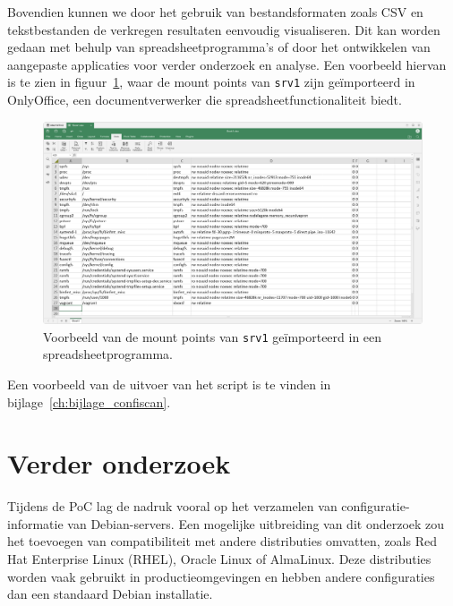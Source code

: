 Bovendien kunnen we door het gebruik van bestandsformaten zoals CSV en tekstbestanden de verkregen resultaten eenvoudig visualiseren.
Dit kan worden gedaan met behulp van spreadsheetprogramma's of door het ontwikkelen van aangepaste applicaties voor verder onderzoek en analyse.
Een voorbeeld hiervan is te zien in figuur~\ref{fig:mountpoints-csv-import-spreadsheet}, waar de mount points van \texttt{srv1} zijn ge\"importeerd in OnlyOffice, een documentverwerker die spreadsheetfunctionaliteit biedt.

\begin{figure}[h!]
    \begin{center}
        \includegraphics[width=\textwidth]
        {./graphics/mountpoints-csv-import-spreadsheet.png}
        \caption[Voorbeeld van mount points in spreadsheet.]{\label{fig:mountpoints-csv-import-spreadsheet}Voorbeeld van de mount points van \texttt{srv1} ge\"importeerd in een spreadsheetprogramma.}
    \end{center}
\end{figure}

Een voorbeeld van de uitvoer van het script is te vinden in bijlage~\ref{ch:bijlage_confiscan}.

\section{Verder onderzoek}
\label{poc_verder_onderzoek}

Tijdens de PoC lag de nadruk vooral op het verzamelen van configuratie-informatie van Debian-servers.
Een mogelijke uitbreiding van dit onderzoek zou het toevoegen van compatibiliteit met andere distributies omvatten, zoals Red Hat Enterprise Linux (RHEL), Oracle Linux of AlmaLinux.
Deze distributies worden vaak gebruikt in productieomgevingen en hebben andere configuraties dan een standaard Debian installatie.

